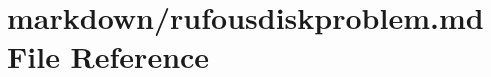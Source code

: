 \hypertarget{rufousdiskproblem_8md}{\section{markdown/rufousdiskproblem.md File Reference}
\label{rufousdiskproblem_8md}
}
